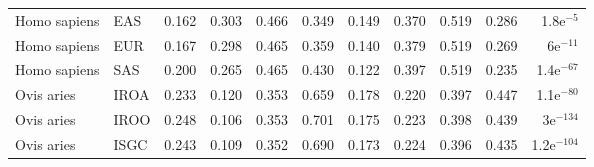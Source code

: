 \begin{center}
\begin{adjustbox}{width = 1\textwidth}
\begin{tabular}{llrrrrrrrrr}
        Homo sapiens &                       EAS &                              0.162 &                               0.303 &                 0.466 &                 0.349 &                              0.149 &                               0.370 &                 0.519 &                 0.286 &   1.8e$^{-5}$ \\
        Homo sapiens &                       EUR &                              0.167 &                               0.298 &                 0.465 &                 0.359 &                              0.140 &                               0.379 &                 0.519 &                 0.269 &    6e$^{-11}$ \\
        Homo sapiens &                       SAS &                              0.200 &                               0.265 &                 0.465 &                 0.430 &                              0.122 &                               0.397 &                 0.519 &                 0.235 &  1.4e$^{-67}$ \\
          Ovis aries &                      IROA &                              0.233 &                               0.120 &                 0.353 &                 0.659 &                              0.178 &                               0.220 &                 0.397 &                 0.447 &  1.1e$^{-80}$ \\
          Ovis aries &                      IROO &                              0.248 &                               0.106 &                 0.353 &                 0.701 &                              0.175 &                               0.223 &                 0.398 &                 0.439 &   3e$^{-134}$ \\
          Ovis aries &                      ISGC &                              0.243 &                               0.109 &                 0.352 &                 0.690 &                              0.173 &                               0.224 &                 0.396 &                 0.435 & 1.2e$^{-104}$ \\
\bottomrule
\end{tabular}
\end{adjustbox}
\end{center}

